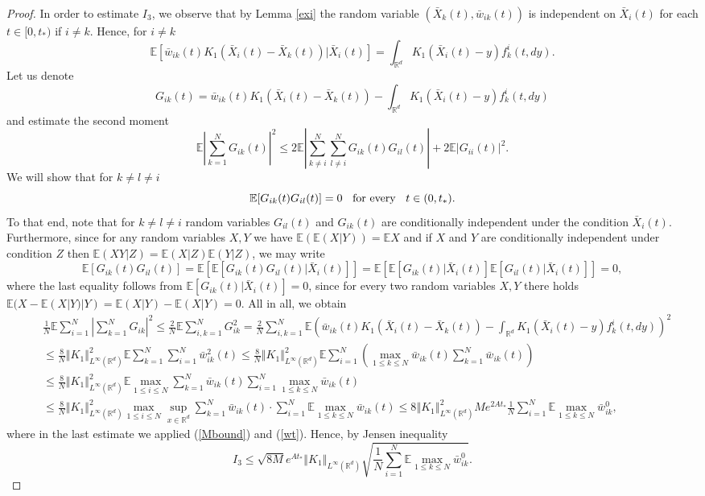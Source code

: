 \documentclass[10pt]{article}
\newcommand{\eqq}[2]{\begin{equation}  #1  \label{#2}\end{equation}    }
\newcommand{\hd}{\hspace{0.2cm}}
\newcommand{\m}[1]{\mbox{#1}}
\newcommand*{\norm}[1]{\left\Vert{#1}\right\Vert}
\newcommand*{\abs}[1]{\left\vert{#1}\right\vert}
\newcommand{\R}{\mathbb{R}}
\newcommand{\ird}{\int_{\mathbb{R}^d}}
\newcommand{\xb}{\bar{X}}
\newcommand{\E}{\mathbb{E}}
\newcommand{\fik}{f^i_k}
\begin{document}
\begin{proof}
In order to estimate $I_3$, we observe that by Lemma \ref{exi} the random variable $(\xb_k(t),\bar{w}_{ik}(t))$ is independent on $\xb_i(t)$ for each $t \in [0,t_*)$ if $i\neq k$. Hence, for $i\neq k$
\[
\E\left[\bar{w}_{ik}(t)K_1(\xb_i(t)-\xb_k(t))| \xb_i(t)\right] = \ird  K_{1}(\xb_i(t)-y)\fik(t,dy).
\]
Let us denote
\[
G_{ik}(t) = \bar{w}_{ik}(t)K_1(\xb_i(t)-\xb_k(t))-  \ird K_{1}(\xb_i(t)-y)\fik(t,dy)
\]
and estimate the second moment
\[
  \E \abs{\sum_{k=1}^N G_{ik}(t)}^2 \leq 2 \E \abs{\sum_{k\neq i}^N \sum_{l\neq i}^N G_{ik}(t)G_{il}(t)}
  + 2 \E \abs{ G_{ii}(t)}^2.
\]
We will show that for $k\neq l \neq i$
\[
\E [G_{ik}(t)G_{il}(t)] = 0 \hd \m{ for every }\hd t \in (0,t_{*}).
\]
To that end, note that for $k\neq l\neq i$ random variables $G_{il}(t)$ and $G_{ik}(t)$ are conditionally independent under the condition $\xb_i(t)$. Furthermore,  
since for any random variables $X,Y$ we have $\E(\E(X|Y)) = \E X$  and if $X$ and $Y$ are conditionally independent under condition $Z$ then $\E(XY|Z) = \E(X|Z)\E(Y|Z)$, we may write
\[
\E [G_{ik}(t)G_{il}(t)] = \E \left[\E\left[G_{ik}(t)G_{il}(t)|\xb_{i}(t)\right]\right] = \E \left[\E\left[G_{ik}(t)|\xb_{i}(t)\right]\E\left[G_{il}(t)|\xb_{i}(t)\right]\right] = 0,
\]
where the last equality follows from $\E\left[G_{ik}(t)|\xb_{i}(t)\right] = 0$, since for every two random variables $X,Y$ there holds $\E(X-\E(X|Y)|Y) = \E(X|Y) - \E(X|Y) = 0.$ All in all, we obtain 
\begin{align*}
&\frac{1}{N} \E \sum_{i=1}^N \abs{\sum_{k=1}^N G_{ik}}^2\leq  \frac{2}{N} \E \sum_{i,k=1}^N G^2_{ik} = \frac{2}{N}\sum_{i,k=1}^N \E \left( \bar{w}_{ik}(t)K_1(\xb_i(t)-\xb_k(t))-  \ird K_{1}(\xb_i(t)-y)\fik(t,dy)\right)^2\\
 & \leq \frac{8}{N} \norm{K_{1}}_{L^{
\infty}(\R^d)}^2 \E \sum_{k=1}^N \sum_{i=1}^N \bar{w}_{ik}^2(t) \leq  \frac{8}{N} \norm{K_{1}}_{L^{
\infty}(\R^d)}^2  \E \sum_{i=1}^N \left(\max_{1\leq k\leq N}\bar{w}_{ik}(t)\sum_{k=1}^N \bar{w}_{ik}(t)\right)\\
& \leq \frac{8}{N} \norm{K_{1}}_{L^{
\infty}(\R^d)}^2 \E \max_{1\leq i\leq N}\sum_{k=1}^N \bar{w}_{ik}(t) \sum_{i=1}^N\max_{1\leq k\leq N}\bar{w}_{ik}(t) \\
&\leq 
\frac{8}{N} \norm{K_{1}}_{L^{
\infty}(\R^d)}^2 \max_{1\leq i\leq N}\sup_{x\in \R^d}\sum_{k=1}^N \bar{w}_{ik}(t)\cdot\sum_{i=1}^N \E \max_{1\leq k\leq N}\bar{w}_{ik}(t)\leq 8 \norm{K_{1}}_{L^{
\infty}(\R^d)}^2 M e^{2A t_{*}} \frac{1}{N}\sum_{i=1}^N \E \max_{1\leq k\leq N}\bar{w}_{ik}^0, 
\end{align*}
where in the last estimate we applied (\ref{Mbound}) and (\ref{wt}).
Hence, by Jensen inequality 
\eqq{
I_3 \leq \sqrt{8M} e^{At_*}\norm{K_{1}}_{L^{
\infty}(\R^d)} \sqrt{\frac{1}{N}\sum_{i=1}^N \E \max_{1\leq k\leq N}\bar{w}_{ik}^0}.
}{I3}


\end{proof}
\end{document}

